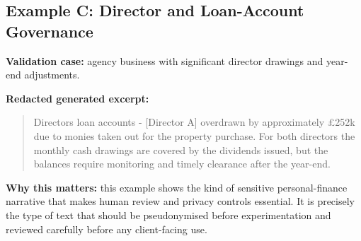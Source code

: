 \subsection{Example C: Director and Loan-Account Governance}

\textbf{Validation case:} agency business with significant director drawings and year-end adjustments.

\textbf{Redacted generated excerpt:}
\begin{quote}
Directors loan accounts - [Director A] overdrawn by approximately \pounds252k due to monies taken out for the property purchase. For both directors the monthly cash drawings are covered by the dividends issued, but the balances require monitoring and timely clearance after the year-end.
\end{quote}

\textbf{Why this matters:} this example shows the kind of sensitive personal-finance narrative that makes human review and privacy controls essential. It is precisely the type of text that should be pseudonymised before experimentation and reviewed carefully before any client-facing use.
